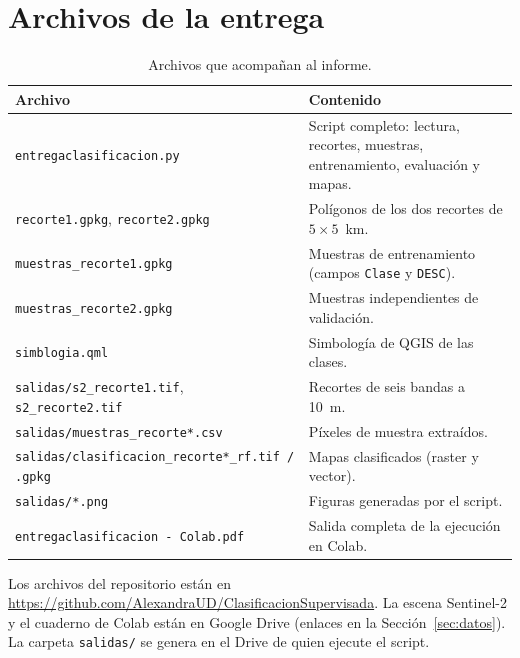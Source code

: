 \documentclass[11pt,letterpaper]{article}
\begin{document}
\section{Archivos de la entrega}
\label{anx:archivos}
\begin{table}[H]
\centering
\caption{Archivos que acompañan al informe.}
\small
\renewcommand{\arraystretch}{1.2}
\begin{tabular}{@{}p{5.6cm}p{9.8cm}@{}}
\toprule
Archivo & Contenido \\
\midrule
\texttt{entregaclasificacion.py} & Script completo: lectura, recortes, muestras, entrenamiento, evaluación y mapas. \\
\texttt{recorte1.gpkg}, \texttt{recorte2.gpkg} & Polígonos de los dos recortes de $5\times5$~km. \\
\texttt{muestras\_recorte1.gpkg} & Muestras de entrenamiento (campos \texttt{Clase} y \texttt{DESC}). \\
\texttt{muestras\_recorte2.gpkg} & Muestras independientes de validación. \\
\texttt{simblogia.qml} & Simbología de QGIS de las clases. \\
\texttt{salidas/s2\_recorte1.tif}, \texttt{s2\_recorte2.tif} & Recortes de seis bandas a 10~m. \\
\texttt{salidas/muestras\_recorte*.csv} & Píxeles de muestra extraídos. \\
\texttt{salidas/clasificacion\_recorte*\_rf.tif / .gpkg} & Mapas clasificados (raster y vector). \\
\texttt{salidas/*.png} & Figuras generadas por el script. \\
\texttt{entregaclasificacion - Colab.pdf} & Salida completa de la ejecución en Colab. \\
\bottomrule
\end{tabular}
\end{table}

Los archivos del repositorio están en \url{https://github.com/AlexandraUD/ClasificacionSupervisada}. La
escena Sentinel-2 y el cuaderno de Colab están en Google Drive (enlaces en la Sección~\ref{sec:datos}). La
carpeta \texttt{salidas/} se genera en el Drive de quien ejecute el script.
\end{document}
